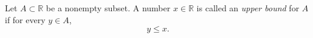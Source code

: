 Let $A \subset \mathbb{R}$ be a nonempty subset. A number $x \in \mathbb{R}$ is called an \textit{upper bound} for $A$ if for every $y \in A$,
\begin{equation*}
y \leq x.
\end{equation*}
